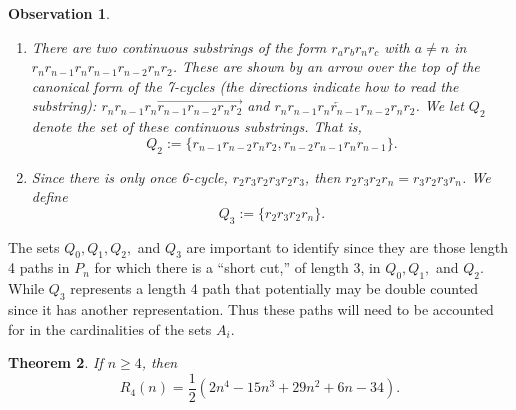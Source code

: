 \documentclass[final]{dmtcs-episciences}
\numberwithin{equation}{section}
\newtheorem{thm}{Theorem}[section]
\newtheorem{observation}[thm]{Observation}
\begin{document}
\begin{observation}
\begin{enumerate}
 \begin{align*}
 Q_1:= \{
 &r_{n-1} r_n r_{n-1} r_{n-2}, 
 r_{n-2} r_n r_2 r_n, \\
 &r_2 r_n r_{n-1} r_n,
 r_{n-1} r_n r_{n-1} r_n, \\ 
 &r_2 r_n r_{n-2} r_{n-1}, 
 r_{n-1} r_n r_2 r_n
 \}.    
 \end{align*}

 \item[(c)]  There are two continuous substrings of the form $r_a r_b r_n r_c$ with $a \neq n$ in $r_n r_{n-1} r_n r_{n-1} r_{n-2} r_n r_2$. These are shown by an arrow over the top of the canonical form of the 7-cycles (the directions indicate how to read the substring): $r_n r_{n-1} r_n \overrightarrow{r_{n-1} r_{n-2} r_n r_2}$ and $r_n \overleftarrow{r_{n-1} r_n r_{n-1} r_{n-2}} r_n r_2$. We let $Q_2$ denote the set of these continuous substrings. That is,%
\[Q_2 := \{r_{n-1} r_{n-2} r_n r_2, r_{n-2} r_{n-1} r_n r_{n-1}\}.\]

\item[(d)] Since there is only once 6-cycle, $r_2r_3r_2r_3r_2r_3$, then $r_2r_3r_2r_n=r_3r_2r_3r_n$. We define \begin{displaymath}Q_3 :=\{r_2 r_3 r_2 r_n\}.\end{displaymath} 
 \end{enumerate}
\end{observation}
 

The sets $Q_0, Q_1, Q_2,$ and $Q_3$ are important to identify since they are those length 4 paths in $P_n$ for which there is a ``short cut,'' of length 3, in $Q_0, Q_1,$ and $Q_2$. While $Q_3$ represents a length 4 path that potentially may be double counted since it has another representation. Thus these paths will need to be accounted for in the cardinalities of the sets $A_i$.

\begin{thm}\label{t:snk=4} If $n\geq4$, then
\[
R_4(n)=\frac{1}{2} (2 n^4 - 15 n^3 + 29 n^2 + 6 n - 34).
\]
\end{thm}
\end{document}
